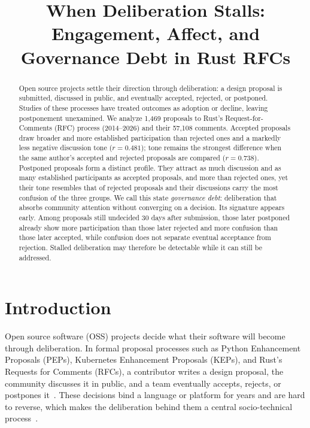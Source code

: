\documentclass[conference]{IEEEtran}
\begin{document}
\title{When Deliberation Stalls: Engagement, Affect, and Governance Debt in Rust RFCs}

\maketitle

\begin{abstract}
Open source projects settle their direction through deliberation: a design proposal is submitted, discussed in public, and eventually accepted, rejected, or postponed. Studies of these processes have treated outcomes as adoption or decline, leaving postponement unexamined. We analyze 1,469 proposals to Rust's Request-for-Comments (RFC) process (2014--2026) and their 57,108 comments. Accepted proposals draw broader and more established participation than rejected ones and a markedly less negative discussion tone ($r = 0.481$); tone remains the strongest difference when the same author's accepted and rejected proposals are compared ($r = 0.738$). Postponed proposals form a distinct profile. They attract as much discussion and as many established participants as accepted proposals, and more than rejected ones, yet their tone resembles that of rejected proposals and their discussions carry the most confusion of the three groups. We call this state \emph{governance debt}: deliberation that absorbs community attention without converging on a decision. Its signature appears early. Among proposals still undecided 30 days after submission, those later postponed already show more participation than those later rejected and more confusion than those later accepted, while confusion does not separate eventual acceptance from rejection. Stalled deliberation may therefore be detectable while it can still be addressed.
\end{abstract}

\section{Introduction}
Open source software (OSS) projects decide what their software will become through deliberation. In formal proposal processes such as Python Enhancement Proposals (PEPs), Kubernetes Enhancement Proposals (KEPs), and Rust's Requests for Comments (RFCs), a contributor writes a design proposal, the community discusses it in public, and a team eventually accepts, rejects, or postpones it~\cite{9402135, https://doi.org/10.1002/spe.3128}. These decisions bind a language or platform for years and are hard to reverse, which makes the deliberation behind them a central socio-technical process~\cite{lambiase2024cultural}.
\end{document}
